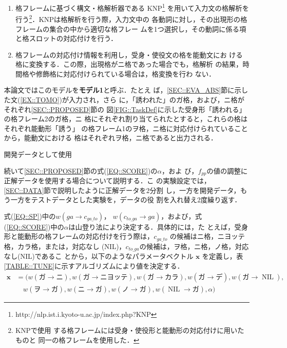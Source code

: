 \documentclass[japanese]{jnlp_1.4}
\renewcommand{\paragraph}{}
\begin{document}
    \begin{enumerate}
     \item 格フレームに基づく構文・格解析器である
	   KNP\footnote{http://nlp.ist.i.kyoto-u.ac.jp/index.php?KNP}
	   \hspace{-0.2em}を用いて入力文の格解析を行う\footnote{KNPで使用
	   する格フレームには受身・使役形と能動形の対応付けに用いたものと
	   同一の格フレームを使用した．}．KNPは格解析を行う際，入力文中の
	   各動詞に対し，その出現形の格フレームの集合の中から適切な格フレー
	   ムを1つ選択し，その動詞に係る項と格スロットの対応付けを行う．
     \item 格フレームの対応付け情報を利用し，受身・使役文の格を能動文にお
	   ける格に変換する．この際，出現格がニ格であった場合でも，格解析
	   の結果，時間格や修飾格に対応付けられている場合は，格変換を行わ
	   ない．
    \end{enumerate} 

    本論文ではこのモデルを\textbf{モデル1}と呼ぶ．たとえ
    ば，\ref{SEC::EVA_ABS}節に示した文(\ref{EX::TOMO})が入力され，さら
    に，「誘われた」のガ格，および，ニ格がそれぞれ\ref{SEC::PROPOSED}節の
    図\ref{FIG::TaskDef}に示した受身形「誘われる」の格フレーム2のガ格，ニ
    格にそれぞれ割り当てられたとすると，これらの格はそれぞれ能動形「誘う」
    の格フレーム1のヲ格，ニ格に対応付けられていることから，能動文における
    格はそれぞれヲ格，ニ格であると出力される．


\paragraph{
開発データとして使用}

    続いて\ref{SEC::PROPOSED}節の式(\ref{EQ::SCORE})の$\alpha$，およ
    び，$f_{pp}$の値の調整に正解データを使用する場合について説明する．こ
    の実験設定では，\ref{SEC::DATA}節で説明したように正解データを2分割
    し，一方を開発データ，もう一方をテストデータとした実験を，データの役
    割を入れ替え2度繰り返す．
    
    式(\ref{EQ::SP})中の$w(ga\rightarrow c_\mathit{ga\_to})$，
$w(c_\mathit{to\_ga} \rightarrow  ga)$，および，式
    (\ref{EQ::SCORE})中の$\alpha$は山登り法により決定する．具体的には，た
    とえば，受身形と能動形の格フレームの対応付けを行う際は，$c_\mathit{ga\_to}$
    の候補はニ格，ニヨッテ格，カラ格，または，対応なし
    (NIL)，$c_\mathit{to\_ga}$の候補は，ヲ格，ニ格，ノ格，対応なし(NIL)であるこ
    とから，以下のようなパラメータベクトル $\mathbf{x}$ を定義し，表
    \ref{TABLE::TUNE}に示すアルゴリズムにより値を決定する．
\begin{align*}
  \mathbf{x} & = (w(ガ \rightarrow ニ), w(ガ \rightarrow ニヨッテ),
       w(ガ\rightarrow カラ), w(ガ \rightarrow デ), w(ガ \rightarrow \operatorname{NIL}), \\
     & \quad w(ヲ \rightarrow ガ), w(ニ \rightarrow ガ), w(ノ \rightarrow ガ), 
	w(\operatorname{NIL}\rightarrow ガ), \alpha)
\end{align*}
    
\end{document}
